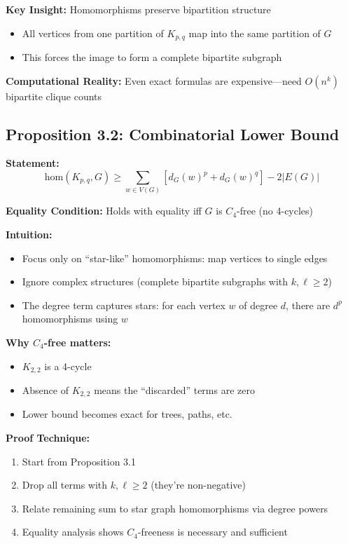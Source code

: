 \documentclass[12pt,a4paper]{article}
\begin{document}
\textbf{Key Insight:} Homomorphisms preserve bipartition structure
\begin{itemize}
    \item All vertices from one partition of $K_{p,q}$ map into the same partition of $G$
    \item This forces the image to form a complete bipartite subgraph
\end{itemize}

\textbf{Computational Reality:} Even exact formulas are expensive---need $O(n^k)$ bipartite clique counts

\subsection{Proposition 3.2: Combinatorial Lower Bound}

\textbf{Statement:}
\[
\text{hom}(K_{p,q}, G) \geq \sum_{w \in V(G)} [d_G(w)^p + d_G(w)^q] - 2|E(G)|
\]

\textbf{Equality Condition:} Holds with equality iff $G$ is $C_4$-free (no 4-cycles)

\textbf{Intuition:}
\begin{itemize}
    \item Focus only on ``star-like'' homomorphisms: map vertices to single edges
    \item Ignore complex structures (complete bipartite subgraphs with $k,\ell \geq 2$)
    \item The degree term captures stars: for each vertex $w$ of degree $d$, there are $d^p$ homomorphisms using $w$
\end{itemize}

\textbf{Why $C_4$-free matters:}
\begin{itemize}
    \item $K_{2,2}$ is a 4-cycle
    \item Absence of $K_{2,2}$ means the ``discarded'' terms are zero
    \item Lower bound becomes exact for trees, paths, etc.
\end{itemize}

\textbf{Proof Technique:}
\begin{enumerate}
    \item Start from Proposition 3.1
    \item Drop all terms with $k,\ell \geq 2$ (they're non-negative)
    \item Relate remaining sum to star graph homomorphisms via degree powers
    \item Equality analysis shows $C_4$-freeness is necessary and sufficient
\end{enumerate}
\end{document}

